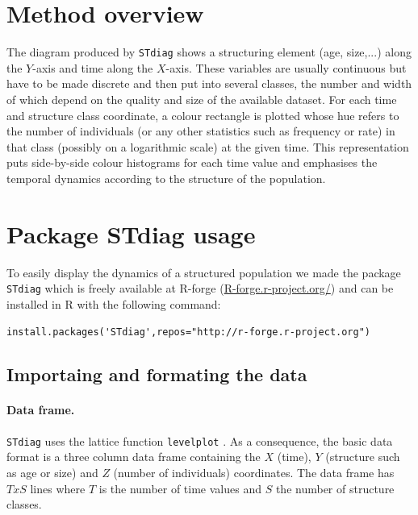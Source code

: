 \section{Method overview}

The diagram produced by \texttt{STdiag} shows a structuring element (age, size,...) along
the $Y$-axis and time along the $X$-axis. These variables are usually continuous
but have to be made discrete and then put into several classes, the number and width
of which depend on the quality and size of the available dataset. For each time
and structure class coordinate, a colour rectangle is plotted whose hue refers
to the number of individuals (or any other statistics such as frequency or rate)
in that class (possibly on a logarithmic scale) at the given time. This
representation puts side-by-side colour histograms for each time value and
emphasises the temporal dynamics according to the structure of the population.

\section{Package STdiag usage}

To easily display the dynamics of a structured population we made the package
\texttt{STdiag} which is freely available at R-forge (\url{R-forge.r-project.org/}) and
can be installed in R with the following command:

\begin{verbatim}
install.packages('STdiag',repos="http://r-forge.r-project.org")
\end{verbatim}

\subsection{Importaing and formating the data}

\paragraph{Data frame.}
\texttt{STdiag} uses the lattice function \texttt{levelplot}
\autocite{sarkar2008a}.
As a consequence, the basic data format is a three column data frame containing the
$X$ (time), $Y$ (structure such as age or size) and $Z$ (number of individuals)
coordinates. The data frame has $TxS$ lines where $T$ is the number of time
values and $S$ the number of structure classes.

